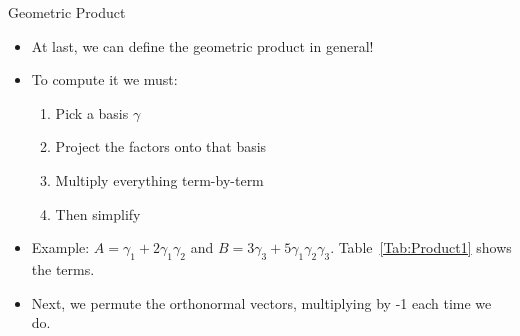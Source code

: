 \documentclass[aspectratio=169,xcolor=dvipsnames]{beamer}
\begin{document}
\begin{frame}{Geometric Product}


\begin{itemize}
      \item<only@1> At last, we can define the geometric product in general!
      \item<only@1> To compute it we must:
            \begin{enumerate}
                  \item Pick a basis $\gamma$
                  \item Project the factors onto that basis
                  \item Multiply everything term-by-term
                  \item Then simplify
            \end{enumerate}
      \item<only@1> Example: $A = \gamma_1 + 2\gamma_1\gamma_2$ and $B = 3\gamma_3 +5\gamma_1\gamma_2\gamma_3$.
            Table~\ref{Tab:Product1} shows the terms.
\setcounter{table}{2}
      \item<2> Next, we permute the orthonormal vectors, multiplying by -1 each time we do.




\end{itemize}
\end{frame}
\end{document}
